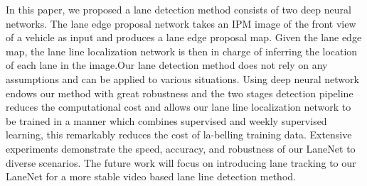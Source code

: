 \documentclass[10pt,twocolumn,letterpaper]{article}
\begin{document}
In this paper, we proposed a lane detection method consists of two deep neural networks.  The lane edge proposal network takes an IPM image of the front view of a vehicle as input and produces a lane edge proposal map. Given the lane edge map, the lane line localization network is then in charge of inferring the location of each lane in the image.Our lane detection method does not rely on any assumptions and can be applied to various situations.  Using deep neural network endows our method with great robustness and the two stages detection pipeline reduces the computational cost  and  allows  our  lane  line  localization  network  to  be trained in a manner which combines supervised and weekly supervised learning, this remarkably reduces the cost of la-belling  training  data.   Extensive  experiments  demonstrate the speed, accuracy, and robustness of our LaneNet to diverse scenarios.  The future work will focus on introducing lane tracking to our LaneNet for a more stable video based lane line detection method.

{\small


}
\end{document}
